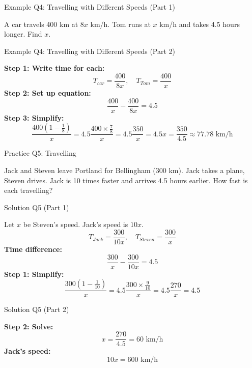 \documentclass[aspectratio=169]{beamer}
\begin{document}
\begin{frame}{Example Q4: Travelling with Different Speeds (Part 1)}
\begin{tcolorbox}[colback=lightgray,colframe=secondary,title=Example Q4 (Part 1)]
\footnotesize
A car travels 400 km at $8x$ km/h. Tom runs at $x$ km/h and takes 4.5 hours longer. Find $x$.
\end{tcolorbox}
\end{frame}

\begin{frame}{Example Q4: Travelling with Different Speeds (Part 2)}
\begin{tcolorbox}[colback=lightgray,colframe=secondary,title=Example Q4 (Part 2)]
\footnotesize
\textbf{Step 1: Write time for each:}
\[
T_{car} = \frac{400}{8x},\quad T_{Tom} = \frac{400}{x}
\]
\textbf{Step 2: Set up equation:}
\[
\frac{400}{x} - \frac{400}{8x} = 4.5
\]
\textbf{Step 3: Simplify:}
\[
\frac{400(1 - \frac{1}{8})}{x} = 4.5
\frac{400 \times \frac{7}{8}}{x} = 4.5
\frac{350}{x} = 4.5
x = \frac{350}{4.5} \approx 77.78 \text{ km/h}
\]
\end{tcolorbox}
\end{frame}

\begin{frame}{Practice Q5: Travelling}
\begin{tcolorbox}[colback=lightgray,colframe=primary,title=Practice Q5]
\footnotesize
Jack and Steven leave Portland for Bellingham (300 km). Jack takes a plane, Steven drives. Jack is 10 times faster and arrives 4.5 hours earlier. How fast is each travelling?
\end{tcolorbox}
\end{frame}

\begin{frame}{Solution Q5 (Part 1)}
\begin{tcolorbox}[colback=lightgray,colframe=accent,title=Solution Q5 (Part 1)]
\footnotesize
Let $x$ be Steven's speed. Jack's speed is $10x$.
\[
T_{Jack} = \frac{300}{10x},\quad T_{Steven} = \frac{300}{x}
\]
\textbf{Time difference:}
\[
\frac{300}{x} - \frac{300}{10x} = 4.5
\]
\textbf{Step 1: Simplify:}
\[
\frac{300(1 - \frac{1}{10})}{x} = 4.5
\frac{300 \times \frac{9}{10}}{x} = 4.5
\frac{270}{x} = 4.5
\]
\end{tcolorbox}
\end{frame}

\begin{frame}{Solution Q5 (Part 2)}
\begin{tcolorbox}[colback=lightgray,colframe=accent,title=Solution Q5 (Part 2)]
\footnotesize
\textbf{Step 2: Solve:}
\[
x = \frac{270}{4.5} = 60 \text{ km/h}
\]
\textbf{Jack's speed:}
\[
10x = 600 \text{ km/h}
\]
\end{tcolorbox}
\end{frame}
\end{document}

